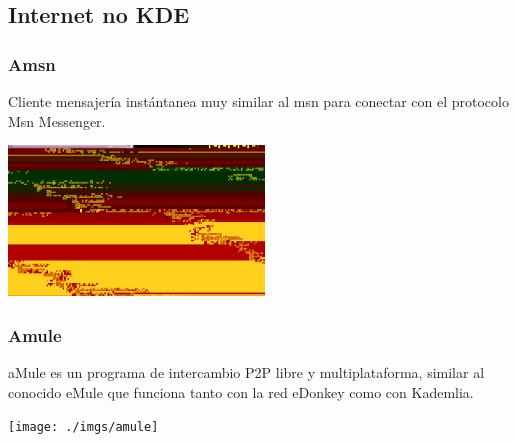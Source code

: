 \subsection{Internet no KDE}
\frame
{
	\frametitle{Amsn}
	Cliente mensajería instántanea muy similar al msn para conectar con el protocolo Msn Messenger.
	\begin{center}
		\includegraphics[height=4cm]{./imgs/amsn}
	\end{center}
}
\frame
{
	\frametitle{Amule}
	 aMule es un programa de intercambio P2P libre y multiplataforma, similar al conocido eMule que funciona tanto con la red eDonkey como con Kademlia.
	\begin{center}
		\texttt{[image: ./imgs/amule]}
	\end{center}

}
